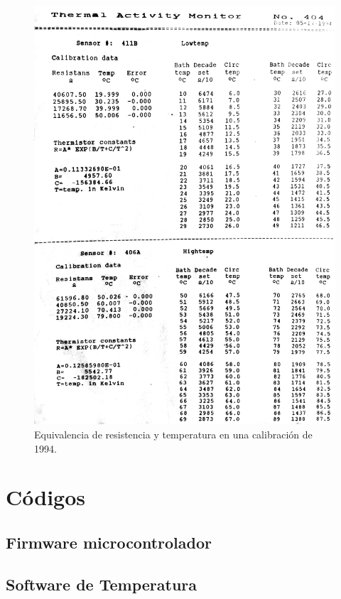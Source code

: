 	\begin{figure}[!h]
		\centering
		\includegraphics[width =\linewidth]{Figures/temperatureTable}
		\caption{Equivalencia de resistencia y temperatura en una calibraci\'on de 1994.}
		\label{fig: temperatureTable}
	\end{figure}

\chapter{Códigos}\label{anx: codigos}
	\section{Firmware microcontrolador}
		
	
	\section{Software de Temperatura}
